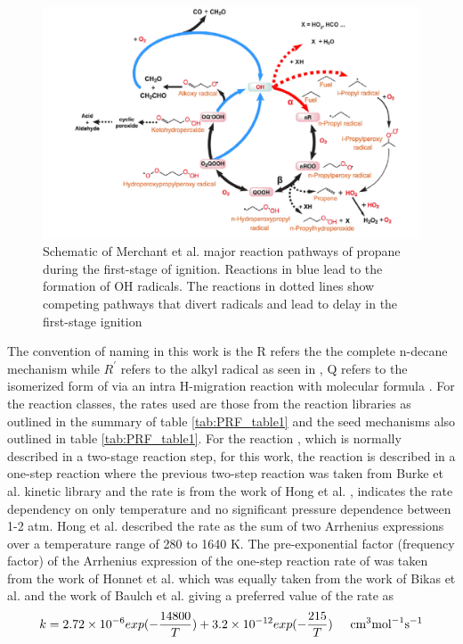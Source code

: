 \begin{figure}
\hspace*{-3cm}
    \centering
    \includegraphics[scale=0.4, keepaspectratio]{images/rxn_class.png}
    \caption{Schematic of Merchant et al.\cite{Merchant2015UnderstandingPropane} major reaction pathways of propane during the first-stage of ignition. Reactions in blue lead to the formation of OH radicals. The reactions in dotted lines show competing pathways that divert radicals and lead to delay in the first-stage ignition}
    \label{fig:n-alkane-pathway}
\end{figure}

The convention of naming in this work is the R refers the the complete n-decane mechanism while $R^\prime$ refers to the alkyl radical as seen in , Q refers to the isomerized form of  via an intra H-migration reaction with molecular formula . For the reaction classes, the rates used are those from the reaction libraries as outlined in the summary of table \ref{tab:PRF_table1} and the seed mechanisms also outlined in table \ref{tab:PRF_table1}. For the reaction , which is normally described in a two-stage reaction step, for this work, the reaction is described in  a one-step reaction where the previous two-step reaction was taken from Burke et al. kinetic library \cite{Burke2012ComprehensiveCombustion} and the rate is from the work of Hong et al. \cite{Hong2010AOH}, indicates the rate dependency on only temperature and no significant pressure dependence between 1-2 atm. Hong et al. described the rate as the sum of two Arrhenius expressions over a temperature range of 280 to 1640 K.
The pre-exponential factor (frequency factor) of the Arrhenius expression of the one-step reaction rate of 
 was taken from the work of Honnet et al.\cite{Honnet2009AKerosene} which was equally taken from the work of Bikas et al.\cite{Bikas2001KineticAutoignition} and the work of Baulch et al. \cite{Baulch2005EvaluatedII} giving a preferred value of the rate as 
\begin{equation}
    k=2.72\times 10^{-6}exp(-\frac{14800}{T}) + 3.2\times 10^{-12}exp(-\frac{215}{T}) \hspace{0.5cm}  \text{cm}^3 \text{mol}^{-1} \text{s}^{-1}
\end{equation}


